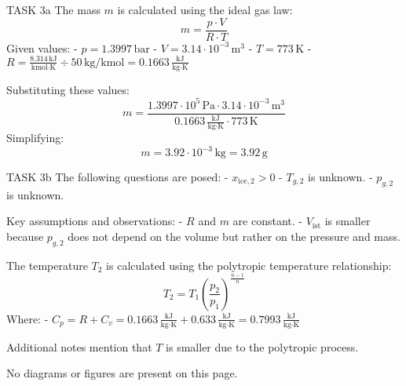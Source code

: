 TASK 3a  
The mass \( m \) is calculated using the ideal gas law:  
\[
m = \frac{p \cdot V}{R \cdot T}
\]  
Given values:  
- \( p = 1.3997 \, \text{bar} \)  
- \( V = 3.14 \cdot 10^{-3} \, \text{m}^3 \)  
- \( T = 773 \, \text{K} \)  
- \( R = \frac{8.314 \, \text{kJ}}{\text{kmol} \cdot \text{K}} \div 50 \, \text{kg/kmol} = 0.1663 \, \frac{\text{kJ}}{\text{kg} \cdot \text{K}} \)  

Substituting these values:  
\[
m = \frac{1.3997 \cdot 10^5 \, \text{Pa} \cdot 3.14 \cdot 10^{-3} \, \text{m}^3}{0.1663 \, \frac{\text{kJ}}{\text{kg} \cdot \text{K}} \cdot 773 \, \text{K}}
\]  
Simplifying:  
\[
m = 3.92 \cdot 10^{-3} \, \text{kg} = 3.92 \, \text{g}
\]  

TASK 3b  
The following questions are posed:  
- \( x_{\text{ice},2} > 0 \)  
- \( T_{g,2} \) is unknown.  
- \( p_{g,2} \) is unknown.  

Key assumptions and observations:  
- \( R \) and \( m \) are constant.  
- \( V_{\text{ist}} \) is smaller because \( p_{g,2} \) does not depend on the volume but rather on the pressure and mass.  

The temperature \( T_2 \) is calculated using the polytropic temperature relationship:  
\[
T_2 = T_1 \left( \frac{p_2}{p_1} \right)^{\frac{n-1}{n}}
\]  
Where:  
- \( C_p = R + C_v = 0.1663 \, \frac{\text{kJ}}{\text{kg} \cdot \text{K}} + 0.633 \, \frac{\text{kJ}}{\text{kg} \cdot \text{K}} = 0.7993 \, \frac{\text{kJ}}{\text{kg} \cdot \text{K}} \)  

Additional notes mention that \( T \) is smaller due to the polytropic process.  

No diagrams or figures are present on this page.